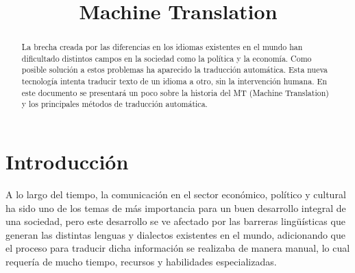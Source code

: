 \documentclass[conference]{IEEEtran}
\begin{document}
%
\title{ Machine Translation}


\author{
    \and
    \and
    \and
}


\maketitle

\begin{abstract}
La brecha creada por las diferencias en los idiomas existentes en el mundo han dificultado distintos campos en la sociedad como la política y la economía. Como posible solución a estos problemas ha aparecido la traducción automática.
Esta nueva tecnología intenta traducir texto de un idioma a otro, sin la intervención humana. En este documento se presentará un poco sobre la historia del MT (Machine Translation) y los principales métodos de traducción automática.

\end{abstract}

\IEEEpeerreviewmaketitle

\section{Introducción}

A lo largo del tiempo, la comunicación en el sector económico, político y cultural ha sido uno de los temas de más importancia para un buen desarrollo integral de una sociedad, pero este desarrollo se ve afectado por las barreras lingüísticas que generan las distintas lenguas y dialectos existentes en el mundo, adicionando que el proceso para traducir dicha información se realizaba de manera manual, lo cual requería de mucho tiempo, recursos y habilidades especializadas.
\end{document}
